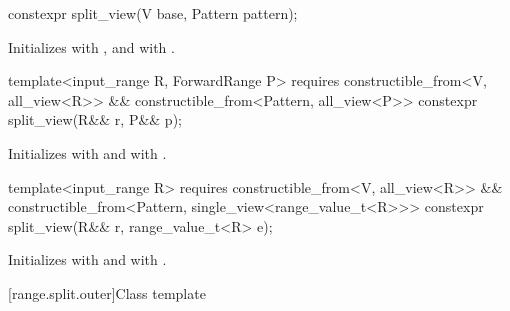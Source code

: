%
\begin{itemdecl}
constexpr split_view(V base, Pattern pattern);
\end{itemdecl}

\begin{itemdescr}
\pnum
\effects Initializes  with , and
 with .
\end{itemdescr}

%
\begin{itemdecl}
template<input_range R, ForwardRange P>
  requires constructible_from<V, all_view<R>> &&
           constructible_from<Pattern, all_view<P>>
constexpr split_view(R&& r, P&& p);
\end{itemdecl}

\begin{itemdescr}
\pnum
\effects
Initializes  with  and
 with .
\end{itemdescr}

%
\begin{itemdecl}
template<input_range R>
  requires constructible_from<V, all_view<R>> &&
           constructible_from<Pattern, single_view<range_value_t<R>>>
constexpr split_view(R&& r, range_value_t<R> e);
\end{itemdecl}

\begin{itemdescr}
\pnum
\effects
Initializes  with  and
 with .
\end{itemdescr}

[range.split.outer]{Class template }

